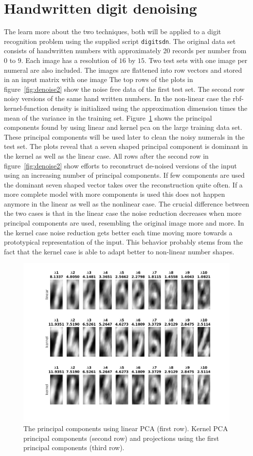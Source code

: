 \section{Handwritten digit denoising}
The learn more about the two techniques, both will be applied to a digit recognition problem using the supplied script \texttt{digitsdn}. The original data set consists of handwritten numbers with approximately 20 records per number from $0$ to $9$. Each image has a resolution of $16$ by $15$. Two test sets with one image per numeral are also included. The images are flattened into row vectors and stored in an input matrix with one image The top rows of the plots in figure~\ref{fig:denoise2} show the noise free data of the first test set. The second row noisy versions of the same hand written numbers. 
In the non-linear case the rbf-kernel-function density is initialized using the approximation dimension times the mean of the variance in the training set. Figure~\ref{fig:pcKerLin} shows the principal components found by using linear and kernel pca on the large training data set. These principal components will be used later to clean the noisy numerals in the test set. The plots reveal that a seven shaped principal component is dominant in the kernel as well as the linear case. All rows after the second row in figure~\ref{fig:denoise2} show efforts to reconstruct de-noised versions of the input using an increasing number of principal components. If few components are used the dominant seven shaped vector takes over the reconstruction quite often. If a more complete model with more components is used this does not happen anymore in the linear as well as the nonlinear case. The crucial difference between the two cases is that in the linear case the noise reduction decreases when more principal components are used, resembling the original image more and more. In the kernel case noise reduction gets better each time moving more towards a prototypical representation of the input. This behavior probably stems from the fact that the kernel case is able to adapt better to non-linear number shapes. 
\begin{figure}
\centering
\includegraphics[width=0.7\linewidth]{../src/figure/pcKerLin}
\caption{The principal components using linear PCA (first row). Kernel PCA principal components (second row) and projections using the first principal components (third row).}
\label{fig:pcKerLin}
\end{figure}
